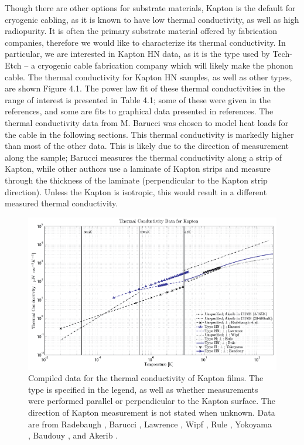\documentclass{report}
\begin{document}
Though there are other options for substrate materials, Kapton is the default for cryogenic cabling, as it is known to have low thermal conductivity, as well as high radiopurity. It is often the primary substrate material offered by fabrication companies, therefore we would like to characterize its thermal conductivity. In particular, we are interested in Kapton HN data, as it is the type used by Tech-Etch -- a cryogenic cable fabrication company which will likely make the phonon cable. The thermal conductivity for Kapton HN samples, as well as other types, are shown Figure 4.1. The power law fit of these thermal conductivities in the range of interest is presented in Table 4.1; some of these were given in the references, and some are fits to graphical data presented in references. The thermal conductivity data from M. Barucci \cite{bar} was chosen to model heat loads for the cable in the following sections. This thermal conductivity is markedly higher than most of the other data. This is likely due to the direction of measurement along the sample; Barucci measures the thermal conductivity along a strip of Kapton, while other authors use a laminate of Kapton strips and measure through the thickness of the laminate (perpendicular to the Kapton strip direction). Unless the Kapton is isotropic, this would result in a different measured thermal conductivity.

\begin{figure}[h]
\includegraphics[width = .9\textwidth]{Kapton_var.png}
\caption{Compiled data for the thermal conductivity of Kapton films. The type is specified in the legend, as well as whether measurements were performed parallel or perpendicular to the Kapton surface. The direction of Kapton measurement is not stated when unknown. Data are from Radebaugh \cite{rad73}, Barucci \cite{bar}, Lawrence \cite{law}, Wipf \cite{wip}, Rule \cite{Rule1996}, Yokoyama \cite{yok}, Baudouy \cite{Baudouy2003}, and Akerib \cite{Akerib}. }
\end{figure}
\end{document}
